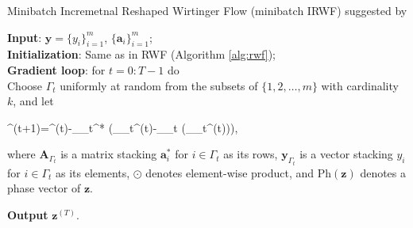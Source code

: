 		\begin{algorithm}[th]
			\caption{Minibatch Incremetnal Reshaped Wirtinger Flow (minibatch IRWF) suggested by \cite{zhang2016reshaped}}\label{alg:mbirwf}
			
			\textbf{Input}: $\boldsymbol{y}=\{y_i\}_{i=1}^m$, $\{\boldsymbol{a}_i\}_{i=1}^m$; \\
			\textbf{Initialization}: Same as in RWF (Algorithm \ref{alg:rwf}); \\
			
			 \textbf{Gradient loop}: for $t=0:T-1$ do\\
			 Choose $\Gamma_t$ uniformly at random from the subsets of  $\{1,2,\ldots, m\}$ with cardinality $k$, and let
			 \begin{flalign}
				\boldsymbol{z}^{(t+1)}=^{(t)}-\mu\cdot{}_{\Gamma_t}^* \left(_{\Gamma_t}^{(t)}-_{\Gamma_t}\odot{} (_{\Gamma_t}^{(t)})\right), \label{eq:mbirwfUpdate}
			\end{flalign}
			where $\boldsymbol{A}_{\Gamma_t}$ is a matrix stacking $\boldsymbol{a}_i^*$ for $i\in \Gamma_t$ as its rows,  $\boldsymbol{y}_{\Gamma_t}$ is a vector stacking $y_i$ for $i\in \Gamma_t$ as its elements, $\odot$ denotes element-wise product, and $\text{Ph}(\boldsymbol{z})$ denotes a phase vector of $\boldsymbol{z}$.%
			
			\textbf{Output} $\boldsymbol{z}^{(T)}$.
			\end{algorithm}


			$ $